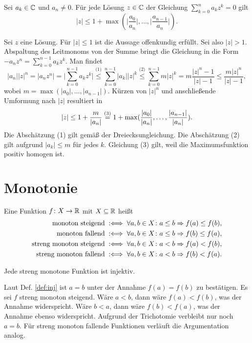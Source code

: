 \begin{Satz}%
\newlinefirst
Sei $a_k\in\mathbb C$ und $a_n\ne 0$. Für jede Lösung $z\in\mathbb C$ der Gleichung
$\sum_{k=0}^n a_k z^k = 0$ gilt%
\[|z| \le 1 + \max(\bigg|\frac{a_0}{a_n}\bigg|,\ldots,\bigg|\frac{a_{n-1}}{a_n}\bigg|).\]
\end{Satz}
\begin{Beweis}
Sei $z$ eine Lösung. Für $|z|\le 1$ ist die Aussage offenkundig
erfüllt. Sei also $|z|>1$. Abspaltung des Leitmonoms von der Summe
bringt die Gleichung in die Form $-a_n z^n = \sum_{k=0}^{n-1} a_k z^k$.
Man findet
\[|a_n| |z|^n = |a_n z^n| = \bigg|\sum_{k=0}^{n-1} a_k z^k\bigg|
\stackrel{\text{(1)}} \le \sum_{k=0}^{n-1} |a_k| |z|^k
\stackrel{\text{(2)}} \le \sum_{k=0}^{n-1} m |z|^k
= m\frac{|z|^n-1}{|z|-1} \le \frac{m|z|^n}{|z|-1},\]
wobei $m=\max(|a_0|,\ldots,|a_{n-1}|)$. Kürzen von $|z|^n$ und
anschließende Umformung nach $|z|$ resultiert in
\[|z| \le 1 + \frac{m}{|a_n|} \stackrel{\text(3)}=
1 + \max(\frac{|a_0|}{|a_n|},\ldots,\frac{|a_{n-1}|}{|a_n|}).\]
Die Abschätzung (1) gilt gemäß der Dreiecksungleichung. Die
Abschätzung (2) gilt aufgrund $|a_k|\le m$ für jedes $k$. Gleichung
(3) gilt, weil die Maximumsfunktion positiv homogen ist.\,\qedsymbol
\end{Beweis}

\newpage
\section{Monotonie}
\begin{Definition}\label{def:monotonic}\newlinefirst
Eine Funktion $f\colon X\to \mathbb R$ mit $X\subseteq\mathbb R$ heißt
\begin{align*}
\text{monoton steigend}&\;:\Longleftrightarrow\;\forall a,b\in X\colon a\le b\Rightarrow f(a)\le f(b),\\
\text{monoton fallend}&\;:\Longleftrightarrow\;\forall a,b\in X\colon a\le b\Rightarrow f(b)\le f(a),\\
\text{streng monoton steigend}&\;:\Longleftrightarrow\;\forall a,b\in X\colon a<b\Rightarrow f(a)<f(b),\\
\text{streng monoton fallend}&\;:\Longleftrightarrow\;\forall a,b\in X\colon a<b\Rightarrow f(b)<f(a).
\end{align*}
\end{Definition}

\begin{Satz}
Jede streng monotone Funktion ist injektiv.
\end{Satz}
\begin{Beweis}
Laut Def. \ref{def:inj} ist $a=b$ unter der Annahme $f(a)=f(b)$ zu
bestätigen. Es sei $f$ streng monoton steigend. Wäre $a<b$, dann wäre $f(a)<f(b)$,
was der Annahme widerspricht. Wäre $b<a$, dann wäre $f(b)<f(a)$, was der
Annahme ebenso widerspricht. Aufgrund der Trichotomie verbleibt nur
noch $a=b$. Für streng monoton fallende Funktionen verläuft die
Argumentation analog.\,\qedsymbol
\end{Beweis}

